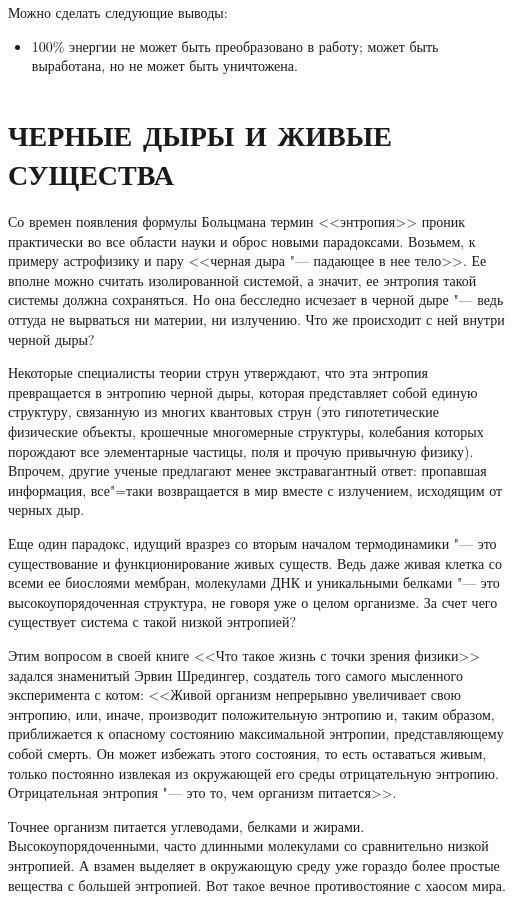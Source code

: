 \documentclass[referat, times]{SCWorks}
\begin{document}
Можно сделать следующие выводы:
\begin{itemize}
\item100\% энергии не может быть преобразовано в работу;
 может быть выработана, но не может быть уничтожена\cite{termod}.
\end{itemize}

\section{ЧЕРНЫЕ ДЫРЫ И ЖИВЫЕ СУЩЕСТВА}
Со времен появления формулы Больцмана термин <<энтропия>> проник практически во все области науки и оброс новыми парадоксами. Возьмем, к примеру астрофизику и пару <<черная дыра "--- падающее в нее тело>>. Ее вполне можно считать изолированной системой, а значит, ее энтропия такой системы должна сохраняться. Но она бесследно исчезает в черной дыре "--- ведь оттуда не вырваться ни материи, ни излучению. Что же происходит с ней внутри черной дыры?

Некоторые специалисты теории струн утверждают, что эта энтропия превращается в энтропию черной дыры, которая представляет собой единую структуру, связанную из многих квантовых струн (это гипотетические физические объекты, крошечные многомерные структуры, колебания которых порождают все элементарные частицы, поля и прочую привычную физику). Впрочем, другие ученые предлагают менее экстравагантный ответ: пропавшая информация, все"=таки возвращается в мир вместе с излучением, исходящим от черных дыр.

Еще один парадокс, идущий вразрез со вторым началом термодинамики "--- это существование и функционирование живых существ. Ведь даже живая клетка со всеми ее биослоями мембран, молекулами ДНК и уникальными белками "--- это высокоупорядоченная структура, не говоря уже о целом организме. За счет чего существует система с такой низкой энтропией?

Этим вопросом в своей книге <<Что такое жизнь с точки зрения физики>> задался знаменитый Эрвин Шредингер, создатель того самого мысленного эксперимента с котом: <<Живой организм непрерывно увеличивает свою энтропию, или, иначе, производит положительную энтропию и, таким образом, приближается к опасному состоянию максимальной энтропии, представляющему собой смерть. Он может избежать этого состояния, то есть оставаться живым, только постоянно извлекая из окружающей его среды отрицательную энтропию. Отрицательная энтропия "--- это то, чем организм питается>>.

Точнее организм питается углеводами, белками и жирами. Высокоупорядоченными, часто длинными молекулами со сравнительно низкой энтропией. А взамен выделяет в окружающую среду уже гораздо более простые вещества с большей энтропией. Вот такое вечное противостояние с хаосом мира\cite{chd}.
\end{document}
